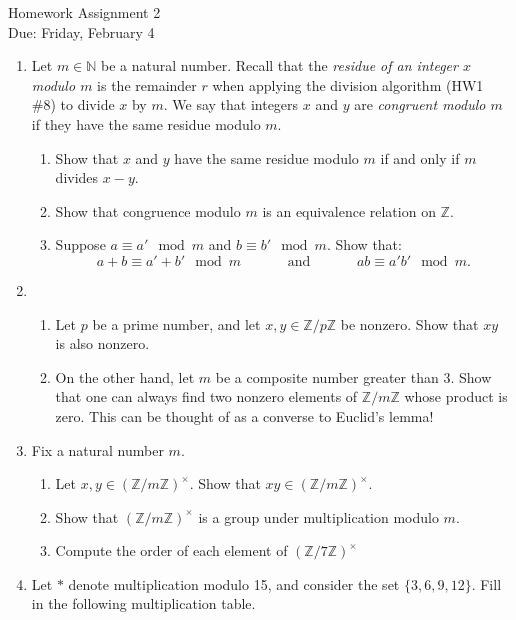 \documentclass[11pt]{article}
\newcommand{\bN}{\mathbb{N}}
\newcommand{\bZ}{\mathbb{Z}}
\begin{document}
\begin{center}
	\Large {Homework Assignment 2}\\
	\small {Due: Friday, February 4}
\end{center}
\begin{enumerate}
    \item{
    Let $m\in\bN$ be a natural number.  Recall that the \textit{residue of an integer $x$ modulo $m$} is the remainder $r$ when applying the division algorithm (HW1 \#8) to divide $x$ by $m$.  We say that integers $x$ and $y$ are \textit{congruent modulo $m$} if they have the same residue modulo $m$.
    \begin{enumerate}
  	\item{
      Show that $x$ and $y$ have the same residue modulo $m$ if and only if $m$ divides $x-y$.
    	}
      \item{
      Show that congruence modulo $m$ is an equivalence relation on $\bZ$.
  	  }
      \item{
      Suppose $a\equiv a'\mod m$ and $b\equiv b'\mod m$.  Show that:
      \[a+b\equiv a'+b'\mod m\hspace{40pt}\text{and}\hspace{40pt}ab\equiv a'b'\mod m.\]
      }
    \end{enumerate}
    }
  \item{
    \begin{enumerate}
      \item{
      Let $p$ be a prime number, and let $x,y\in\bZ/p\bZ$ be nonzero.  Show that $xy$ is also nonzero.
      }
      \item{
      On the other hand, let $m$ be a composite number greater than 3.  Show that one can always find two nonzero elements of $\bZ/m\bZ$ whose product is zero.  This can be thought of as a converse to Euclid's lemma!
      }
    \end{enumerate}
  }
  \item{
  Fix a natural number $m$.
  \begin{enumerate}
  	\item{
    Let $x,y\in(\bZ/m\bZ)^\times$.  Show that $xy\in(\bZ/m\bZ)^\times$.
    }
  	\item{
    Show that $(\bZ/m\bZ)^\times$ is a group under multiplication modulo $m$.
    }
  	\item{
    Compute the order of each element of $(\bZ/7\bZ)^\times$
    }
  \end{enumerate}
  }
	\item Let $*$ denote multiplication modulo 15, and consider the set $\{3,6,9,12\}$.  Fill in the following multiplication table.

\end{enumerate}
\end{document}
